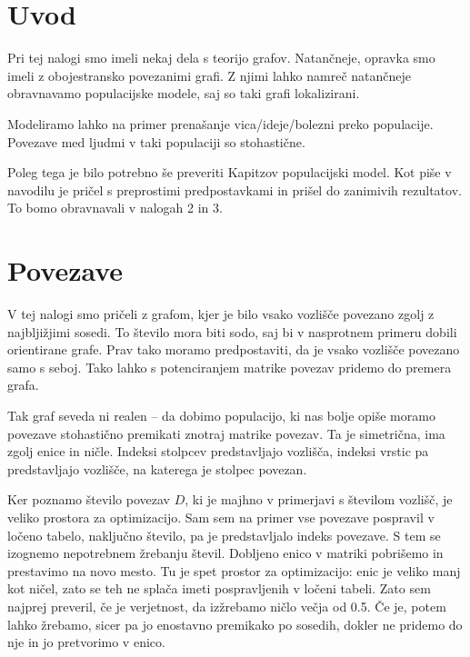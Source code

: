 \documentclass[12pt, a4paper]{article}
\begin{document}
\section{Uvod}

Pri tej nalogi smo imeli nekaj dela s teorijo grafov. Natan\v{c}neje, opravka smo imeli z obojestransko povezanimi
grafi. Z njimi lahko namre\v{c} natan\v{c}neje obravnavamo populacijske modele, saj so taki grafi lokalizirani.

Modeliramo lahko na primer prena\v{s}anje vica/ideje/bolezni preko populacije. Povezave med ljudmi v taki populaciji so
stohasti\v{c}ne.

Poleg tega je bilo potrebno \v{s}e preveriti Kapitzov populacijski model. Kot pi\v{s}e v navodilu je pri\v{c}el s
preprostimi predpostavkami in pri\v{s}el do zanimivih rezultatov. To bomo obravnavali v nalogah 2 in 3.

\section{Povezave}

V tej nalogi smo pri\v celi z grafom, kjer je bilo vsako vozli\v s\v ce povezano zgolj z najblji\v zjimi sosedi. To
\v stevilo mora biti sodo, saj bi v nasprotnem primeru dobili orientirane grafe. Prav tako moramo predpostaviti, da je
vsako vozli\v s\v ce povezano samo s seboj. Tako lahko s potenciranjem matrike povezav pridemo do premera grafa.

Tak graf seveda ni realen -- da dobimo populacijo, ki nas bolje opi\v se moramo povezave stohasti\v cno premikati
znotraj matrike povezav. Ta je simetri\v cna, ima zgolj enice in ni\v cle. Indeksi stolpcev predstavljajo vozli\v s\v ca,
indeksi vrstic pa predstavljajo vozli\v s\v ce, na katerega je stolpec povezan.

Ker poznamo \v stevilo povezav $D$, ki je majhno v primerjavi s \v stevilom vozli\v s\v c, je veliko prostora za
optimizacijo. Sam sem na primer vse povezave pospravil v lo\v ceno tabelo, naklju\v cno \v stevilo, pa je predstavljalo
indeks povezave. S tem se izognemo nepotrebnem \v zrebanju \v stevil. Dobljeno enico v matriki pobri\v semo in prestavimo
na novo mesto. Tu je spet prostor za optimizacijo: enic je veliko manj kot ni\v cel, zato se teh ne spla\v ca imeti
pospravljenih v lo\v ceni tabeli. Zato sem najprej preveril, \v ce je verjetnost, da iz\v zrebamo ni\v clo ve\v cja od
0.5. \v Ce je, potem lahko \v zrebamo, sicer pa jo enostavno premikako po sosedih, dokler ne pridemo do nje in jo
pretvorimo v enico.
\end{document}
